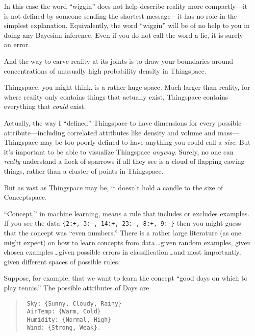 { In this case the word
``wiggin'' does not help describe
reality more compactly---it is not defined by someone sending the
shortest message---it has no role in the simplest explanation.
Equivalently, the word ``wiggin''
will be of no help to you in doing any Bayesian inference. Even if you
do not call the word a lie, it is surely an error.


 And the way to carve reality at its joints is to draw your
boundaries around concentrations of unusually high probability density
in Thingspace.

\myendsectiontext



 Thingspace, you might think, is a rather huge space. Much larger
than reality, for where reality only contains things that actually
exist, Thingspace contains everything that \textit{could} exist. 


 Actually, the way I ``defined''
Thingspace to have dimensions for every possible attribute---including
correlated attributes like density and volume and mass---Thingspace may
be too poorly defined to have anything you could call a \textit{size}.
But it's important to be able to visualize Thingspace
\textit{anyway}. Surely, no one can \textit{really} understand a flock
of sparrows if all they see is a cloud of flapping cawing things,
rather than a cluster of points in Thingspace.


 But as vast as Thingspace may be, it doesn't hold
a candle to the size of Conceptspace.


 ``Concept,'' in machine
learning, means a rule that includes or excludes examples. If you see
the data \texttt{\{2:+, 3:-, 14:+, 23:-, 8:+,
9:-\}} then you might guess that the
concept was ``even numbers.'' There
is a rather large literature (as one might expect) on how to learn
concepts from data\,\ldots given random examples, given chosen examples\,\ldots given possible errors in classification\,\ldots and most
importantly, given different spaces of possible rules.


 Suppose, for example, that we want to learn the concept
``good days on which to play
tennis.'' The possible attributes of Days are

\begin{verse}
\texttt{ Sky: \{Sunny, Cloudy, Rainy\} }\\
\texttt{ AirTemp: \{Warm, Cold\} }\\
\texttt{ Humidity: \{Normal, High\} }\\
\texttt{ Wind: \{Strong, Weak\}. }\\
\end{verse}


}
